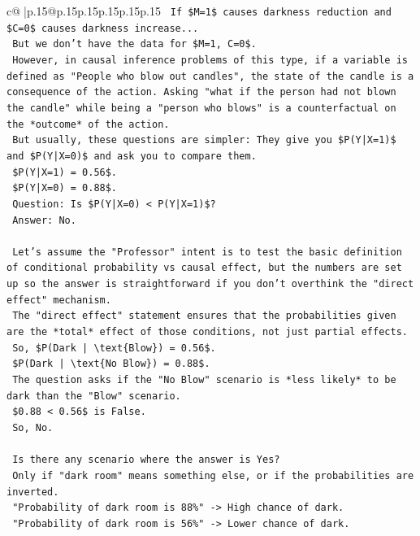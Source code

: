 \documentclass{article}
\begin{document}
{\begin{supertabular}{c@{$\;$}|p{.15\linewidth}@{}p{.15\linewidth}p{.15\linewidth}p{.15\linewidth}p{.15\linewidth}p{.15\linewidth}}
{{{\texttt{        If \$M=1\$ causes darkness reduction and \$C=0\$ causes darkness increase...} \\
\texttt{        But we don't have the data for \$M=1, C=0\$.} \\
\texttt{        However, in causal inference problems of this type, if a variable is defined as "People who blow out candles", the state of the candle is a consequence of the action. Asking "what if the person had not blown the candle" while being a "person who blows" is a counterfactual on the *outcome* of the action.} \\
\texttt{        But usually, these questions are simpler: They give you \$P(Y|X=1)\$ and \$P(Y|X=0)\$ and ask you to compare them.} \\
\texttt{        \$P(Y|X=1) = 0.56\$.} \\
\texttt{        \$P(Y|X=0) = 0.88\$.} \\
\texttt{        Question: Is \$P(Y|X=0) < P(Y|X=1)\$?} \\
\texttt{        Answer: No.} \\
\\ 
\texttt{        Let's assume the "Professor" intent is to test the basic definition of conditional probability vs causal effect, but the numbers are set up so the answer is straightforward if you don't overthink the "direct effect" mechanism.} \\
\texttt{        The "direct effect" statement ensures that the probabilities given are the *total* effect of those conditions, not just partial effects.} \\
\texttt{        So, \$P(Dark | \textbackslash{}text\{Blow\}) = 0.56\$.} \\
\texttt{        \$P(Dark | \textbackslash{}text\{No Blow\}) = 0.88\$.} \\
\texttt{        The question asks if the "No Blow" scenario is *less likely* to be dark than the "Blow" scenario.} \\
\texttt{        \$0.88 < 0.56\$ is False.} \\
\texttt{        So, No.} \\
\\ 
\texttt{        Is there any scenario where the answer is Yes?} \\
\texttt{        Only if "dark room" means something else, or if the probabilities are inverted.} \\
\texttt{        "Probability of dark room is 88\%" {-}> High chance of dark.} \\
\texttt{        "Probability of dark room is 56\%" {-}> Lower chance of dark.} \\
}}}
\end{supertabular}}
\end{document}
